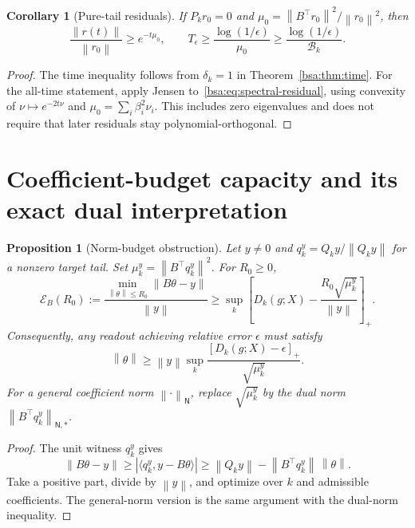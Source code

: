 \documentclass[11pt,letterpaper]{article}
\newcommand{\bsaNorm}[1]{\left\lVert #1\right\rVert}
\newcommand{\bsaPos}[1]{\left[#1\right]_+}
\newtheorem{bsaProposition}{Proposition}[section]
\newtheorem{bsaCorollary}{Corollary}[section]
\theoremstyle{remark}
\theoremstyle{plain}
\begin{document}
\begin{bsaCorollary}[Pure-tail residuals]
\label{bsa:cor:pure-tail}
If $P_kr_0=0$ and $\mu_0=\bsaNorm{B^\top r_0}^2/\bsaNorm{r_0}^2$, then
\begin{equation}
 \frac{\bsaNorm{r(t)}}{\bsaNorm{r_0}}\ge e^{-t\mu_0},\qquad
 T_\epsilon\ge\frac{\log(1/\epsilon)}{\mu_0}
 \ge\frac{\log(1/\epsilon)}{\mathcal B_k}.
 \label{bsa:eq:pure-tail}
\end{equation}
\end{bsaCorollary}
\begin{proof}
The time inequality follows from $\delta_k=1$ in Theorem~\ref{bsa:thm:time}. For the all-time statement, apply Jensen to~\eqref{bsa:eq:spectral-residual}, using convexity of $\nu\mapsto e^{-2t\nu}$ and $\mu_0=\sum_i\beta_i^2\nu_i$. This includes zero eigenvalues and does not require that later residuals stay polynomial-orthogonal.
\end{proof}

\section{Coefficient-budget capacity and its exact dual interpretation}
\label{bsa:sec:budget}

\begin{bsaProposition}[Norm-budget obstruction]
\label{bsa:prop:budget}
Let $y\ne0$ and $q_k^y=Q_ky/\bsaNorm{Q_ky}$ for a nonzero target tail. Set
$\mu_k^y=\bsaNorm{B^\top q_k^y}^2$. For $R_0\ge0$,
\begin{equation}
 \mathcal E_B(R_0):=\frac{\min_{\bsaNorm\theta\le R_0}\bsaNorm{B\theta-y}}{\bsaNorm y}
 \ge\sup_k\bsaPos{D_k(g;X)-\frac{R_0\sqrt{\mu_k^y}}{\bsaNorm y}}.
 \label{bsa:eq:budget-lower}
\end{equation}
Consequently, any readout achieving relative error $\epsilon$ must satisfy
\begin{equation}
 \bsaNorm\theta\ge\bsaNorm y\sup_k
 \frac{\bsaPos{D_k(g;X)-\epsilon}}{\sqrt{\mu_k^y}}.
 \label{bsa:eq:required-norm}
\end{equation}
For a general coefficient norm $\bsaNorm{\cdot}_{\mathsf N}$, replace $\sqrt{\mu_k^y}$ by the dual norm $\bsaNorm{B^\top q_k^y}_{\mathsf N,*}$.
\end{bsaProposition}
\begin{proof}
The unit witness $q_k^y$ gives
\[
 \bsaNorm{B\theta-y}\ge|\langle q_k^y,y-B\theta\rangle|
 \ge\bsaNorm{Q_ky}-\bsaNorm{B^\top q_k^y}\,\bsaNorm\theta.
\]
Take a positive part, divide by $\bsaNorm y$, and optimize over $k$ and admissible coefficients. The general-norm version is the same argument with the dual-norm inequality.
\end{proof}
\end{document}

